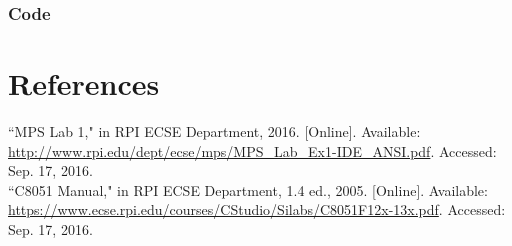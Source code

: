 \documentclass[12pt]{article}
\begin{document}
	\subsubsection{Code}
		
	
	
\section{References} 
\noindent
``MPS Lab 1," in RPI ECSE Department, 2016. [Online]. Available: \url{http://www.rpi.edu/dept/ecse/mps/MPS_Lab_Ex1-IDE_ANSI.pdf}. Accessed: Sep. 17, 2016.\\
\newline\noindent
``C8051 Manual," in RPI ECSE Department, 1.4 ed., 2005. [Online]. Available: \url{https://www.ecse.rpi.edu/courses/CStudio/Silabs/C8051F12x-13x.pdf}. Accessed: Sep. 17, 2016.
\end{document}
